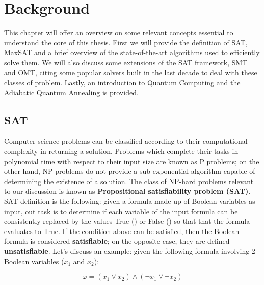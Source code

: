 \chapter{Background}
\label{cha:introQA}

This chapter will offer an overview on some relevant concepts essential to understand the core of this thesis. First we will provide the definition of SAT, MaxSAT and a brief overview of the state-of-the-art algorithms used to efficiently solve them. We will also discuss some extensions of the SAT framework, SMT and OMT, citing some popular solvers built in the last decade to deal with these classes of problem. Lastly, an introduction to Quantum Computing and the Adiabatic Quantum Annealing is provided.

\section{SAT}
\label{sec:sat}

Computer science problems can be classified according to their computational complexity in returning a solution. Problems which complete their tasks in polynomial time with respect to their input size are known as P problems; on the other hand, NP problems do not provide a sub-exponential algorithm capable of determining the existence of a solution. The class of NP-hard problems relevant to our discussion is known as \textbf{Propositional satisfiability problem (SAT)}. \\
SAT definition is the following: given a formula made up of Boolean variables as input, out task is to determine if each variable of the input formula can be consistently replaced by the values True () or False () so that that the formula evaluates to True. If the condition above can be satisfied, then the Boolean formula is considered \textbf{satisfiable}; on the opposite case, they are defined \textbf{unsatisfiable}. Let's discuss an example: given the following formula involving 2 Boolean variables ($x_1$ and $x_2$):

\begin{equation}
    \varphi = ( x_1 \vee x_2) \wedge (\neg x_1 \vee \neg x_2)
\end{equation}

